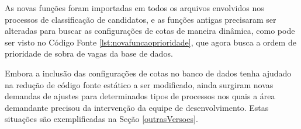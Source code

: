 As novas funções foram importadas em todos os arquivos envolvidos nos processos de classificação de candidatos, e as funções antigas precisaram ser alteradas para buscar as configurações de cotas de maneira dinâmica, como pode ser visto no Código Fonte \ref{lst:novafuncaoprioridade}, que agora busca a ordem de prioridade de sobra de vagas da base de dados. 





Embora a inclusão das configurações de cotas no banco de dados tenha ajudado na redução de código fonte estático a ser modificado, ainda surgiram novas demandas de ajustes para determinados tipos de processos nos quais a área demandante precisou da intervenção da equipe de desenvolvimento. Estas situações são
exemplificadas na Seção \ref{outrasVersoes}.